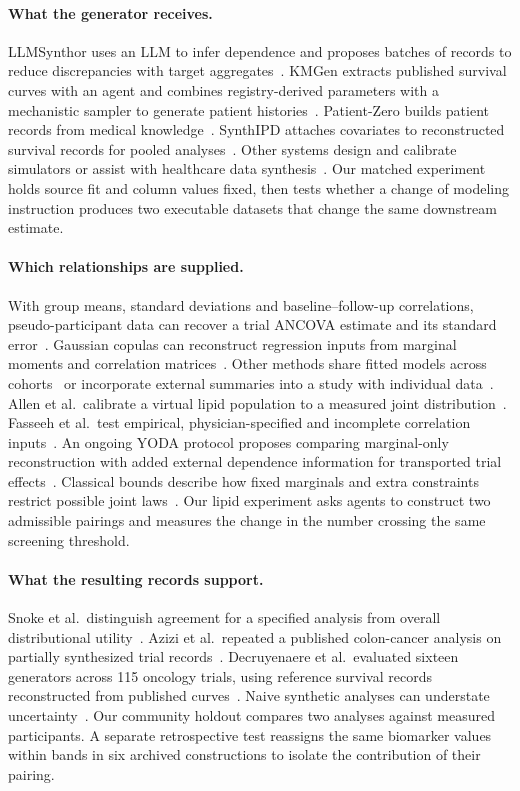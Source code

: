 \documentclass[sigconf,anonymous,review]{acmart}
\begin{document}
\paragraph{What the generator receives.}
LLMSynthor uses an LLM to infer dependence and proposes batches of records to reduce discrepancies with target aggregates~\cite{llmsynthor}. KMGen extracts published survival curves with an agent and combines registry-derived parameters with a mechanistic sampler to generate patient histories~\cite{kmgen}. Patient-Zero builds patient records from medical knowledge~\cite{patientzero}. SynthIPD attaches covariates to reconstructed survival records for pooled analyses~\cite{synthipd}. Other systems design and calibrate simulators or assist with healthcare data synthesis~\cite{gsim,synthcraft}. Our matched experiment holds source fit and column values fixed, then tests whether a change of modeling instruction produces two executable datasets that change the same downstream estimate.

\paragraph{Which relationships are supplied.}
With group means, standard deviations and baseline--follow-up correlations, pseudo-participant data can recover a trial ANCOVA estimate and its standard error~\cite{pseudoancova}. Gaussian copulas can reconstruct regression inputs from marginal moments and correlation matrices~\cite{bonofiglio}. Other methods share fitted models across cohorts~\cite{filshtein} or incorporate external summaries into a study with individual data~\cite{syndi}. Allen et al.\ calibrate a virtual lipid population to a measured joint distribution~\cite{allenlipid}. Fasseeh et al.\ test empirical, physician-specified and incomplete correlation inputs~\cite{fasseeh}. An ongoing YODA protocol proposes comparing marginal-only reconstruction with added external dependence information for transported trial effects~\cite{yodaprotocol}. Classical bounds describe how fixed marginals and extra constraints restrict possible joint laws~\cite{bounds,makarov,zaev}. Our lipid experiment asks agents to construct two admissible pairings and measures the change in the number crossing the same screening threshold.

\paragraph{What the resulting records support.}
Snoke et al.\ distinguish agreement for a specified analysis from overall distributional utility~\cite{specificutility}. Azizi et al.\ repeated a published colon-cancer analysis on partially synthesized trial records~\cite{azizi}. Decruyenaere et al.\ evaluated sixteen generators across 115 oncology trials, using reference survival records reconstructed from published curves~\cite{oncology115}. Naive synthetic analyses can understate uncertainty~\cite{inferential,oncology115}. Our community holdout compares two analyses against measured participants. A separate retrospective test reassigns the same biomarker values within bands in six archived constructions to isolate the contribution of their pairing.
\end{document}
